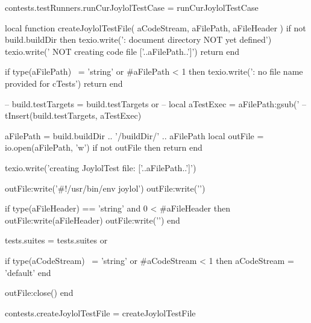 contests.testRunners.runCurJoylolTestCase = runCurJoylolTestCase
\stopLuaCode

\startMkIVCode
\def\createJoylolTestFile#1#2#3{%
  \directlua{
    thirddata.contests.createJoylolTestFile('#1', '#2', '#3')
  }
}
\stopMkIVCode

\startLuaCode
local function createJoylolTestFile(
  aCodeStream, aFilePath, aFileHeader
)
  if not build.buildDir then
    texio.write('\nERROR: document directory NOT yet defined\n')
    texio.write('       NOT creating code file ['..aFilePath..']\n\n')
    return
  end

  if type(aFilePath) ~= 'string'
    or #aFilePath < 1 then
    texio.write('\nERROR: no file name provided for cTests\n\n')
    return
  end

--  build.testTargets = build.testTargets or { }
--  local aTestExec = aFilePath:gsub('%
--  tInsert(build.testTargets, aTestExec)

  aFilePath = build.buildDir .. '/buildDir/' .. aFilePath
  local outFile = io.open(aFilePath, 'w')
  if not outFile then
    return
  end
  
  texio.write('creating JoylolTest file: ['..aFilePath..']\n')

  outFile:write('#!/usr/bin/env joylol\n')
  outFile:write('\n\n')
  
  if type(aFileHeader) == 'string'
    and 0 < #aFileHeader then
    outFile:write(aFileHeader)
    outFile:write('\n\n')
  end

  tests.suites = tests.suites or { }

  if type(aCodeStream) ~= 'string'
    or #aCodeStream < 1 then
    aCodeStream = 'default'
  end

  outFile:close()
end

contests.createJoylolTestFile = createJoylolTestFile
\stopLuaCode
